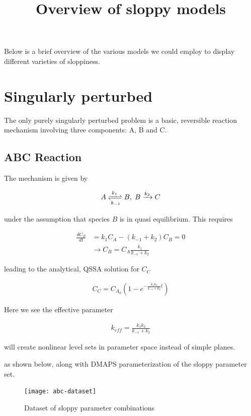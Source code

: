 \documentclass[11pt]{article}
\title{Overview of sloppy models}
\begin{document}
\maketitle

Below is a brief overview of the various models we could employ to display different varieties of sloppiness.

\section{Singularly perturbed}

The only purely singularly perturbed problem is a basic, reversible reaction mechanism involving three components: A, B and C.

\subsection{ABC Reaction}

The mechanism is given by

\begin{align*}
  A \xrightleftharpoons[k_{-1}]{k_1} B, \; B \xrightarrow[]{k_2} C
\end{align*}

under the assumption that species $B$ is in quasi equilibrium. This requires

\begin{align*}
  \frac{dC_B}{dt} &= k_1 C_A - (k_{-1} + k_2) C_B = 0 \\
  &\rightarrow C_B = C_A \frac{k_1}{k_{-1} + k_2}
\end{align*}

leading to the analytical, QSSA solution for $C_C$

\begin{align*}
  C_C = C_{A_0}(1 - e^{-\frac{k_1 k_2}{k_{-1} + k_2} t})
\end{align*}

Here we see the effective parameter

\begin{align*}
  k_{eff} = \frac{k_1 k_2}{k_{-1} + k_2}
\end{align*}

will create nonlinear level sets in parameter space instead of simple planes.

as shown below, along with DMAPS parameterization of the sloppy parameter set.

\begin{figure}[htbp]
  \centering
  \texttt{[image: abc-dataset]}
  \caption{Dataset of sloppy parameter combinations}
\end{figure}
\end{document}
